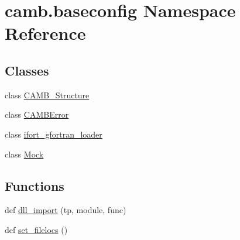\hypertarget{namespacecamb_1_1baseconfig}{}\section{camb.\+baseconfig Namespace Reference}
\label{namespacecamb_1_1baseconfig}
\subsection*{Classes}
\begin{DoxyCompactItemize}
\item 
class \mbox{\hyperlink{classcamb_1_1baseconfig_1_1CAMB__Structure}{C\+A\+M\+B\+\_\+\+Structure}}
\item 
class \mbox{\hyperlink{classcamb_1_1baseconfig_1_1CAMBError}{C\+A\+M\+B\+Error}}
\item 
class \mbox{\hyperlink{classcamb_1_1baseconfig_1_1ifort__gfortran__loader}{ifort\+\_\+gfortran\+\_\+loader}}
\item 
class \mbox{\hyperlink{classcamb_1_1baseconfig_1_1Mock}{Mock}}
\end{DoxyCompactItemize}
\subsection*{Functions}
\begin{DoxyCompactItemize}
\item 
def \mbox{\hyperlink{namespacecamb_1_1baseconfig_a9b1d79118c94ceaefe44393d881c3956}{dll\+\_\+import}} (tp, module, func)
\item 
def \mbox{\hyperlink{namespacecamb_1_1baseconfig_ab9ccfd74eee84e46eb5061d9397e368a}{set\+\_\+filelocs}} ()
\end{DoxyCompactItemize}
